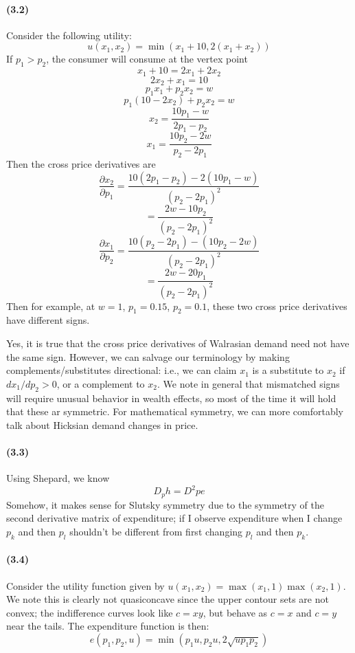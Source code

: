 \documentclass[10pt,letter]{article}
\begin{document}
\paragraph{(3.2)}
Consider the following utility:
\[ u(x_1, x_2) = \min(x_1 + 10, 2(x_1 + x_2)) \]
If $p_1 > p_2$, the consumer will consume at the vertex point
\[ x_1 + 10 = 2x_1 + 2x_2 \]
\[ 2x_2 + x_1 = 10 \]
\[ p_1 x_1 + p_2 x_2 = w \]
\[ p_1 (10 - 2x_2) + p_2 x_2 = w\]
\[ x_2 = \frac{10 p_1 - w}{ 2p_1 - p_2} \]
\[ x_1 = \frac{10 p_2 - 2w}{p_2 - 2p_1} \]
Then the cross price derivatives are
\[ \frac{\partial x_2}{\partial p_1} = \frac{10( 2p_1 - p_2) - 2(10p_1 - w)}{(p_2 - 2p_1)^2}\]
\[ =  \frac{2w -10p_2}{(p_2 - 2p_1)^2}\]
\[ \frac{\partial x_1}{\partial p_2} = \frac{10(p_2 - 2p_1) - (10p_2 - 2w)}{(p_2 - 2p_1)^2}\]
\[ =  \frac{2w -20p_1}{(p_2 - 2p_1)^2}\]
Then for example, at $w=1$, $p_1 = 0.15$, $p_2 = 0.1$, these two cross price derivatives have different signs.

Yes, it is true that the cross price derivatives of Walrasian demand need not have the same sign. However, we can salvage our terminology by making complements/substitutes directional: i.e., we can claim $x_1$ is a substitute to $x_2$ if $dx_1/dp_2 > 0$, or a complement to $x_2$. We note in general that mismatched signs will require unusual behavior in wealth effects, so most of the time it will hold that these ar symmetric. For mathematical symmetry, we can more comfortably talk about Hicksian demand changes in price.

\paragraph{(3.3)}
Using Shepard, we know
\[ D_p h = D^2p e \]
Somehow, it makes sense for Slutsky symmetry due to the symmetry of the second derivative matrix of expenditure; if I observe expenditure when I change $p_k$ and then $p_l$ shouldn't be different from first changing $p_l$ and then $p_k$.
\paragraph{(3.4)}
Consider the utility function given by $u(x_1, x_2) = \max(x_1, 1)\max(x_2, 1)$. We note this is clearly not quasiconcave since the upper contour sets are not convex; the indifference curves look like $c = xy$, but behave as $c=x$ and $c=y$ near the tails. The expenditure function is then:
\[ e(p_1, p_2, u) = \min(p_1 u, p_2 u, 2\sqrt{up_1p_2}) \]
\end{document}

